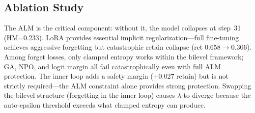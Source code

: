 \subsection{Ablation Study}
\label{sec:ablation}

\begin{table}[t!]
\centering
\small
\caption{Ablation on MUSE Books (seed=42). Each row changes one component from the full \method. LLM judge scores on 0--2 scale.}
\label{tab:ablation}
\end{table}

The ALM is the critical component: without it, the model collapses at step~31 (HM=0.233). LoRA provides essential implicit regularization---full fine-tuning achieves aggressive forgetting but catastrophic retain collapse (ret 0.658$\to$0.306). Among forget losses, only clamped entropy works within the bilevel framework; GA, NPO, and logit margin all fail catastrophically even with full ALM protection. The inner loop adds a safety margin ($+$0.027 retain) but is not strictly required---the ALM constraint alone provides strong protection. Swapping the bilevel structure (forgetting in the inner loop) causes $\lambda$ to diverge because the auto-epsilon threshold exceeds what clamped entropy can produce.


